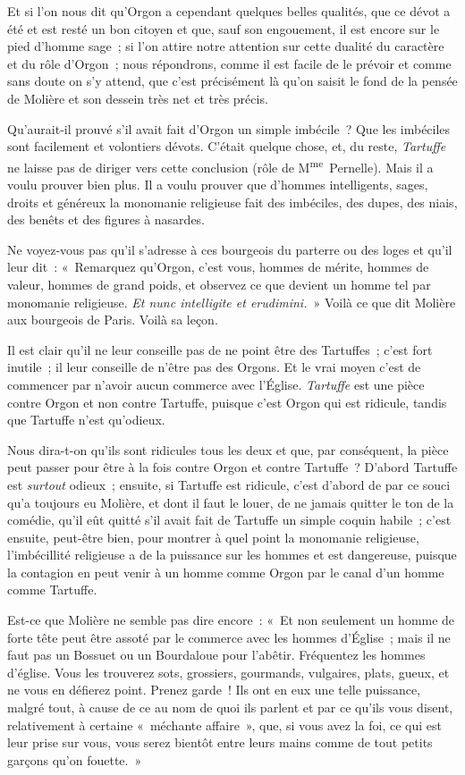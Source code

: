 \documentclass[french,twoside]{book} %
\begin{document}
\noindent Et si l’on nous dit qu’Orgon a cependant quelques belles qualités, que ce dévot a été et est resté un bon citoyen et que, sauf son engouement, il est encore sur le pied d’homme sage ; si l’on attire notre attention sur cette dualité du caractère et du rôle d’Orgon ; nous répondrons, comme il est facile de le prévoir et comme sans doute on s’y attend, que c’est précisément là qu’on saisit le  fond de la pensée de Molière et son dessein très net et très précis.\par
Qu’aurait-il prouvé s’il avait fait d’Orgon un simple imbécile ? Que les imbéciles sont facilement et volontiers dévots. C’était quelque chose, et, du reste, \emph{Tartuffe} ne laisse pas de diriger vers cette conclusion (rôle de M\textsuperscript{me} Pernelle). Mais il a voulu prouver bien plus. Il a voulu prouver que d’hommes intelligents, sages, droits et généreux la monomanie religieuse fait des imbéciles, des dupes, des niais, des benêts et des figures à nasardes.\par
Ne voyez-vous pas qu’il s’adresse à ces bourgeois du parterre ou des loges et qu’il leur dit : « Remarquez qu’Orgon, c’est vous, hommes de mérite, hommes de valeur, hommes de grand poids, et observez ce que devient un homme tel par monomanie religieuse. {\itshape Et nunc intelligite et erudimini.} » Voilà ce que dit Molière aux bourgeois de Paris. Voilà sa leçon.\par
Il est clair qu’il ne leur conseille pas de ne point être des Tartuffes ; c’est fort inutile ; il leur conseille de n’être pas des Orgons. Et le vrai moyen c’est de commencer par n’avoir aucun commerce avec l’Église. \emph{Tartuffe} est une pièce contre Orgon et non contre Tartuffe, puisque c’est Orgon qui est ridicule, tandis que Tartuffe n’est qu’odieux.\par
Nous dira-t-on qu’ils sont ridicules tous les  deux et que, par conséquent, la pièce peut passer pour être à la fois contre Orgon et contre Tartuffe ? D’abord Tartuffe est {\itshape surtout} odieux ; ensuite, si Tartuffe est ridicule, c’est d’abord de par ce souci qu’a toujours eu Molière, et dont il faut le louer, de ne jamais quitter le ton de la comédie, qu’il eût quitté s’il avait fait de Tartuffe un simple coquin habile ; c’est ensuite, peut-être bien, pour montrer à quel point la monomanie religieuse, l’imbécillité religieuse a de la puissance sur les hommes et est dangereuse, puisque la contagion en peut venir à un homme comme Orgon par le canal d’un homme comme Tartuffe.\par
Est-ce que Molière ne semble pas dire encore : « Et non seulement un homme de forte tête peut être assoté par le commerce avec les hommes d’Église ; mais il ne faut pas un Bossuet ou un Bourdaloue pour l’abêtir. Fréquentez les hommes d’église. Vous les trouverez sots, grossiers, gourmands, vulgaires, plats, gueux, et ne vous en défierez point. Prenez garde ! Ils ont en eux une telle puissance, malgré tout, à cause de ce au nom de quoi ils parlent et par ce qu’ils vous disent, relativement à certaine « méchante affaire », que, si vous avez la foi, ce qui est leur prise sur vous, vous serez bientôt entre leurs mains comme de tout petits garçons qu’on fouette. »\par
\end{document}
